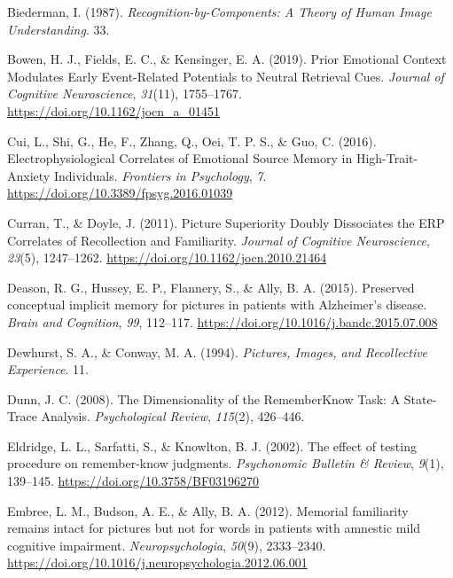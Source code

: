 \documentclass[
  11pt,
]{article}
\begin{document}
\leavevmode\hypertarget{ref-biederman1987}{}%
Biederman, I. (1987). \emph{Recognition-by-Components: A Theory of Human
Image Understanding}. 33.

\leavevmode\hypertarget{ref-bowen2019}{}%
Bowen, H. J., Fields, E. C., \& Kensinger, E. A. (2019). Prior Emotional
Context Modulates Early Event-Related Potentials to Neutral Retrieval
Cues. \emph{Journal of Cognitive Neuroscience}, \emph{31}(11),
1755--1767. \url{https://doi.org/10.1162/jocn_a_01451}

\leavevmode\hypertarget{ref-cui2016}{}%
Cui, L., Shi, G., He, F., Zhang, Q., Oei, T. P. S., \& Guo, C. (2016).
Electrophysiological Correlates of Emotional Source Memory in
High-Trait-Anxiety Individuals. \emph{Frontiers in Psychology},
\emph{7}. \url{https://doi.org/10.3389/fpsyg.2016.01039}

\leavevmode\hypertarget{ref-curran2011}{}%
Curran, T., \& Doyle, J. (2011). Picture Superiority Doubly Dissociates
the ERP Correlates of Recollection and Familiarity. \emph{Journal of
Cognitive Neuroscience}, \emph{23}(5), 1247--1262.
\url{https://doi.org/10.1162/jocn.2010.21464}

\leavevmode\hypertarget{ref-deason2015}{}%
Deason, R. G., Hussey, E. P., Flannery, S., \& Ally, B. A. (2015).
Preserved conceptual implicit memory for pictures in patients with
Alzheimer's disease. \emph{Brain and Cognition}, \emph{99}, 112--117.
\url{https://doi.org/10.1016/j.bandc.2015.07.008}

\leavevmode\hypertarget{ref-dewhurst1994}{}%
Dewhurst, S. A., \& Conway, M. A. (1994). \emph{Pictures, Images, and
Recollective Experience}. 11.

\leavevmode\hypertarget{ref-dunn2008}{}%
Dunn, J. C. (2008). The Dimensionality of the RememberKnow Task: A
State-Trace Analysis. \emph{Psychological Review}, \emph{115}(2),
426--446.

\leavevmode\hypertarget{ref-eldridge2002}{}%
Eldridge, L. L., Sarfatti, S., \& Knowlton, B. J. (2002). The effect of
testing procedure on remember-know judgments. \emph{Psychonomic Bulletin
\& Review}, \emph{9}(1), 139--145.
\url{https://doi.org/10.3758/BF03196270}

\leavevmode\hypertarget{ref-embree2012}{}%
Embree, L. M., Budson, A. E., \& Ally, B. A. (2012). Memorial
familiarity remains intact for pictures but not for words in patients
with amnestic mild cognitive impairment. \emph{Neuropsychologia},
\emph{50}(9), 2333--2340.
\url{https://doi.org/10.1016/j.neuropsychologia.2012.06.001}
\end{document}

